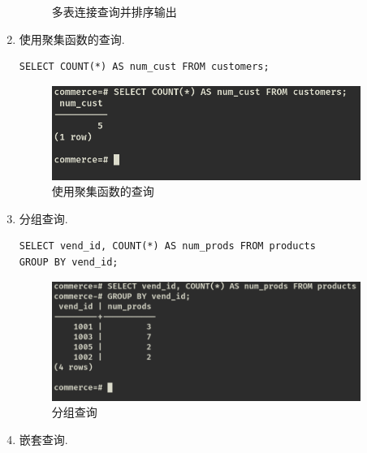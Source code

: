 \begin{enumerate}
\begin{figure}[H]
\begin{center}
  \end{center}
  \caption{多表连接查询并排序输出}
\end{figure}
  \item 使用聚集函数的查询.
\begin{center}
\begin{verbatim}
SELECT COUNT(*) AS num_cust FROM customers;
\end{verbatim}
\end{center}
\begin{figure}[H]
  \begin{center}
    \includegraphics[width=0.95\textwidth,scale=0.5]{./figures/count.png}
  \end{center}
  \caption{使用聚集函数的查询}
\end{figure}
  \item 分组查询.
\begin{center}
\begin{verbatim}
SELECT vend_id, COUNT(*) AS num_prods FROM products
GROUP BY vend_id;
\end{verbatim}
\end{center}
\begin{figure}[H]
  \begin{center}
    \includegraphics[width=0.95\textwidth,scale=0.5]{./figures/group_by.png}
  \end{center}
  \caption{分组查询}
\end{figure}
  \item 嵌套查询.
\begin{center}
\begin{verbatim}

\end{verbatim}
\end{center}
\end{enumerate}
